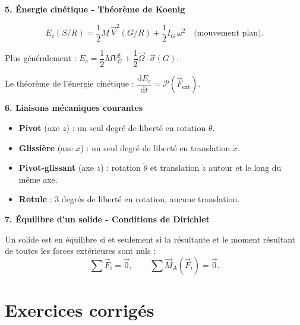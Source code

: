\documentclass[12pt,a4paper]{article}
\begin{document}
\begin{boiteresume}
\medskip
\textbf{5. Énergie cinétique - Théorème de Koenig}

\[
E_c(S/R) = \frac{1}{2}M\,\vec{V}^2(G/R) + \frac{1}{2}I_G\,\omega^2 \quad \text{(mouvement plan).}
\]

Plus généralement : $E_c = \dfrac{1}{2}M V_G^2 + \dfrac{1}{2}\vec{\Omega}\cdot\vec{\sigma}(G)$.

Le théorème de l'énergie cinétique : $\dfrac{\mathrm{d}E_c}{\mathrm{d}t} = \mathcal{P}(\vec{F}_{\mathrm{ext}})$.

\medskip
\textbf{6. Liaisons mécaniques courantes}

\begin{itemize}
  \item \textbf{Pivot} (axe $z$) : un seul degré de liberté en rotation $\dot{\theta}$.
  \item \textbf{Glissière} (axe $x$) : un seul degré de liberté en translation $\dot{x}$.
  \item \textbf{Pivot-glissant} (axe $z$) : rotation $\dot{\theta}$ et translation $\dot{z}$ autour et le long du même axe.
  \item \textbf{Rotule} : 3 degrés de liberté en rotation, aucune translation.
\end{itemize}

\medskip
\textbf{7. Équilibre d'un solide - Conditions de Dirichlet}

Un solide est en équilibre si et seulement si la résultante et le moment résultant de toutes les forces extérieures sont nuls :
\[
\sum \vec{F}_i = \vec{0}, \qquad \sum \vec{M}_A(\vec{F}_i) = \vec{0}.
\]
\end{boiteresume}

\section{Exercices corrigés}
\end{document}
